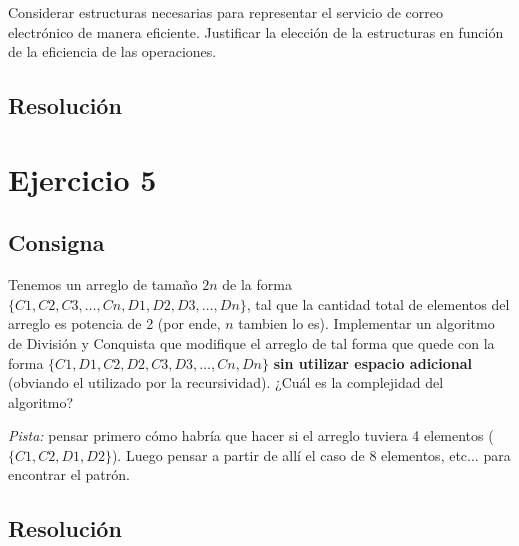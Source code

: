 \documentclass{article}
\begin{document}
Considerar estructuras necesarias para representar el servicio de correo electrónico de manera eficiente. Justificar la elección de la estructuras en función de la eficiencia de las operaciones.

\subsection{Resolución}

\section{Ejercicio 5}

\subsection{Consigna}

Tenemos un arreglo de tamaño $2n$ de la forma $\{C1, C2, C3, \dots, Cn, D1, D2, D3, \dots, Dn\}$, tal que la cantidad total de elementos del arreglo es potencia de 2 (por ende, $n$ tambien lo es). Implementar un algoritmo de División y Conquista que modifique el arreglo de tal forma que quede con la forma $\{C1, D1, C2, D2, C3, D3, \dots, Cn, Dn\}$ \textbf{sin utilizar espacio adicional} (obviando el utilizado por la recursividad). ¿Cuál es la complejidad del algoritmo?

\textit{Pista:} pensar primero cómo habría que hacer si el arreglo tuviera 4 elementos ($\{C1, C2, D1, D2\}$). Luego pensar a partir de allí el caso de 8 elementos, etc... para encontrar el patrón.

\subsection{Resolución}
\end{document}

